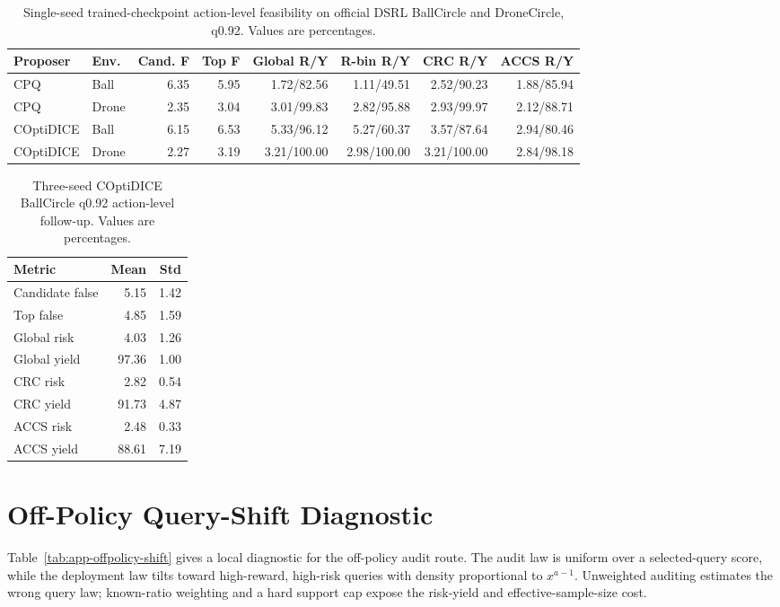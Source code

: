 \documentclass[letterpaper]{article}
\begin{document}
\begin{table}[t]
\centering
\small
\setlength{\tabcolsep}{4pt}
\begin{tabular}{llrrrrrr}
\toprule
Proposer & Env. & Cand. F & Top F & Global R/Y & R-bin R/Y & CRC R/Y & ACCS R/Y \\
\midrule
CPQ & Ball & 6.35 & 5.95 & 1.72/82.56 & 1.11/49.51 & 2.52/90.23 & 1.88/85.94 \\
CPQ & Drone & 2.35 & 3.04 & 3.01/99.83 & 2.82/95.88 & 2.93/99.97 & 2.12/88.71 \\
COptiDICE & Ball & 6.15 & 6.53 & 5.33/96.12 & 5.27/60.37 & 3.57/87.64 & 2.94/80.46 \\
COptiDICE & Drone & 2.27 & 3.19 & 3.21/100.00 & 2.98/100.00 & 3.21/100.00 & 2.84/98.18 \\
\bottomrule
\end{tabular}
\caption{Single-seed trained-checkpoint action-level feasibility on official
DSRL BallCircle and DroneCircle, q0.92. Values are percentages.}
\label{tab:app-ball-drone}
\end{table}

\begin{table}[t]
\centering
\small
\setlength{\tabcolsep}{4pt}
\begin{tabular}{lrr}
\toprule
Metric & Mean & Std \\
\midrule
Candidate false & 5.15 & 1.42 \\
Top false & 4.85 & 1.59 \\
Global risk & 4.03 & 1.26 \\
Global yield & 97.36 & 1.00 \\
CRC risk & 2.82 & 0.54 \\
CRC yield & 91.73 & 4.87 \\
ACCS risk & 2.48 & 0.33 \\
ACCS yield & 88.61 & 7.19 \\
\bottomrule
\end{tabular}
\caption{Three-seed COptiDICE BallCircle q0.92 action-level follow-up. Values
are percentages.}
\label{tab:app-copt-ball}
\end{table}

\clearpage
\section{Off-Policy Query-Shift Diagnostic}

Table~\ref{tab:app-offpolicy-shift} gives a local diagnostic for the
off-policy audit route. The audit law is uniform over a selected-query score,
while the deployment law tilts toward high-reward, high-risk queries with
density proportional to $x^{a-1}$. Unweighted auditing estimates the wrong
query law; known-ratio weighting and a hard support cap expose the risk-yield
and effective-sample-size cost.
\end{document}
